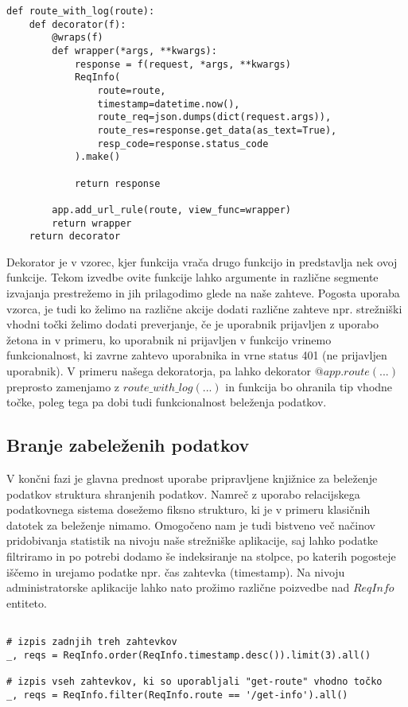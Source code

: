 \documentclass[a4paper,12pt,openright]{book}
\begin{document}
\begin{verbatim}
def route_with_log(route):
    def decorator(f):
        @wraps(f)
        def wrapper(*args, **kwargs):
            response = f(request, *args, **kwargs)
            ReqInfo(
                route=route,
                timestamp=datetime.now(),
                route_req=json.dumps(dict(request.args)),
                route_res=response.get_data(as_text=True),
                resp_code=response.status_code
            ).make()

            return response
        
        app.add_url_rule(route, view_func=wrapper)
        return wrapper
    return decorator
\end{verbatim}

    \noindent
    Dekorator je v vzorec, kjer funkcija vrača drugo funkcijo in predstavlja nek ovoj funkcije. Tekom izvedbe ovite funkcije lahko argumente in različne segmente izvajanja prestrežemo in jih prilagodimo glede na naše zahteve. Pogosta uporaba vzorca, je tudi ko želimo na različne akcije dodati različne zahteve npr. strežniški vhodni točki želimo dodati preverjanje, če je uporabnik prijavljen z uporabo žetona in v primeru, ko uporabnik ni prijavljen v funkcijo vrinemo funkcionalnost, ki zavrne zahtevo uporabnika in vrne status 401 (ne prijavljen uporabnik). V primeru našega dekoratorja, pa lahko dekorator $@app.route(...)$ preprosto zamenjamo z $route\_with\_log(...)$ in funkcija bo ohranila tip vhodne točke, poleg tega pa dobi tudi funkcionalnost beleženja podatkov.

    \subsection{Branje zabeleženih podatkov}

    V končni fazi je glavna prednost uporabe pripravljene knjižnice za beleženje podatkov struktura shranjenih podatkov. Namreč z uporabo relacijskega podatkovnega sistema dosežemo fiksno strukturo, ki je v primeru klasičnih datotek za beleženje nimamo. Omogočeno nam je tudi bistveno več načinov pridobivanja statistik na nivoju naše strežniške aplikacije, saj lahko podatke filtriramo in po potrebi dodamo še indeksiranje na stolpce, po katerih pogosteje iščemo in urejamo podatke npr. čas zahtevka (timestamp). Na nivoju administratorske aplikacije lahko nato prožimo različne poizvedbe nad $ReqInfo$ entiteto.
\begin{verbatim}

# izpis zadnjih treh zahtevkov
_, reqs = ReqInfo.order(ReqInfo.timestamp.desc()).limit(3).all()

# izpis vseh zahtevkov, ki so uporabljali "get-route" vhodno točko
_, reqs = ReqInfo.filter(ReqInfo.route == '/get-info').all()
\end{verbatim}
\end{document}
